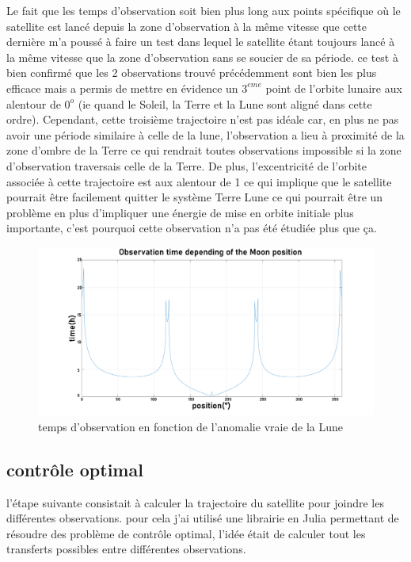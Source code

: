 \documentclass[12pt]{article} %
\begin{document}
		Le fait que les temps d'observation soit bien plus long aux points spécifique où le satellite est lancé depuis la zone d'observation à la même vitesse que cette dernière m'a poussé à faire un test dans lequel le satellite étant toujours lancé à la même vitesse que la zone d'observation sans se soucier de sa période. ce test à bien confirmé que les 2 observations trouvé précédemment sont bien les plus efficace mais a permis de mettre en évidence un $3^{eme}$ point de l'orbite lunaire aux alentour de $0^o$ (ie quand le Soleil, la Terre et la Lune sont aligné dans cette ordre). Cependant, cette troisième trajectoire n'est pas idéale car, en plus ne pas avoir une période similaire à celle de la lune, l'observation a lieu à proximité de la zone d'ombre de la Terre ce qui rendrait toutes observations impossible si la zone d'observation traversais celle de la Terre. De plus, l'excentricité de l'orbite associée à cette trajectoire est aux alentour de 1 ce qui implique que le satellite pourrait être facilement quitter le système Terre Lune ce qui pourrait être un problème en plus d'impliquer une énergie de mise en orbite initiale plus importante, c'est pourquoi cette observation n'a pas été étudiée plus que ça.
		\begin{figure}[h]
			\includegraphics[width=1\textwidth]{images/observation_Obs.png}
			\caption{temps d'observation en fonction de l'anomalie vraie de la Lune}
		\end{figure}
		
		\subsection{contrôle optimal}
		
		l'étape suivante consistait à calculer la trajectoire du satellite pour joindre les différentes observations.
		pour cela j'ai utilisé une librairie en Julia permettant de résoudre des problème de contrôle optimal, l'idée était de calculer tout les transferts possibles entre différentes observations.
		
\end{document}
